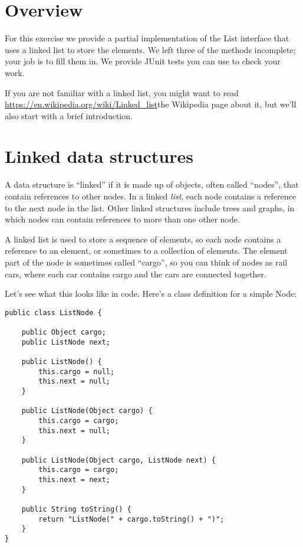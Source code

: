 \documentclass[12pt]{book}
\theoremstyle{exercise}
\begin{document}
\section{Overview}\label{overview-3}

For this exercise we provide a partial implementation of the List interface
that uses a linked list to store the elements. We left three of the
methods incomplete; your job is to fill them in. We provide JUnit tests
you can use to check your work.

If you are not familiar with a linked list, you might want to read
\url{https://en.wikipedia.org/wiki/Linked_list}{the Wikipedia page
about it}, but we'll also start with a brief introduction.

\section{Linked data structures}\label{linked-data-structures}

A data structure is ``linked'' if it is made up of objects, often called
``nodes'', that contain references to other nodes. In a linked
\emph{list}, each node contains a reference to the next node in the
list. Other linked structures include trees and graphs, in which nodes
can contain references to more than one other node.

A linked list is used to store a sequence of elements, so each node
contains a reference to an element, or sometimes to a collection of
elements. The element part of the node is sometimes called ``cargo'', so
you can think of nodes as rail cars, where each car contains cargo and
the cars are connected together.

Let's see what this looks like in code. Here's a class definition for a
simple Node:

\begin{verbatim}
public class ListNode {

    public Object cargo;
    public ListNode next;

    public ListNode() {
        this.cargo = null;
        this.next = null;
    }

    public ListNode(Object cargo) {
        this.cargo = cargo;
        this.next = null;
    }

    public ListNode(Object cargo, ListNode next) {
        this.cargo = cargo;
        this.next = next;
    }

    public String toString() {
        return "ListNode(" + cargo.toString() + ")";
    }
}
\end{verbatim}
\end{document}
